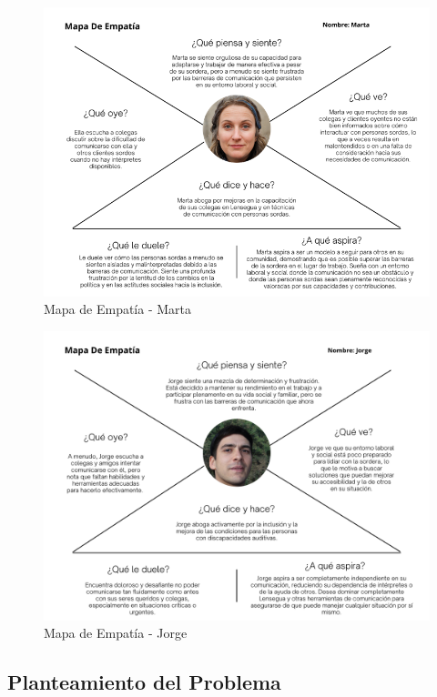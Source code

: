 \begin{figure} [H]
    \centering
    \includegraphics[width=0.9\linewidth]{figuras/mapa_empatia_marta.png}
    \caption{Mapa de Empatía - Marta}
    \label{fig:enter-label}
\end{figure}


\begin{figure} [H]
    \centering
    \includegraphics[width=0.9\linewidth]{figuras/mapa_empatia_jorge_correcto.png}
    \caption{Mapa de Empatía - Jorge}
    \label{fig:enter-label}
\end{figure}

\subsection{Planteamiento del Problema}

